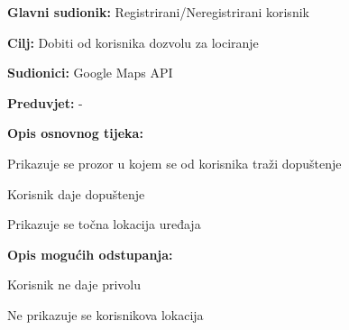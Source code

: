 					\noindent {}
					\begin{packed_item}
	
						\item \textbf{Glavni sudionik: }Registrirani/Neregistrirani korisnik
						\item  \textbf{Cilj:} Dobiti od korisnika dozvolu za lociranje
						\item  \textbf{Sudionici:} Google Maps API
						\item  \textbf{Preduvjet:} -
						\item  \textbf{Opis osnovnog tijeka:}
						
						\item[] \begin{packed_enum}
	
							\item Prikazuje se prozor u kojem se od korisnika traži dopuštenje
							\item Korisnik daje dopuštenje
							\item Prikazuje se točna lokacija uređaja

						\end{packed_enum}
						
						\item  \textbf{Opis mogućih odstupanja:}
						
						\item[] \begin{packed_item}
	
							\item[2.a] Korisnik ne daje privolu
							\item[] \begin{packed_enum}
								
								\item Ne prikazuje se korisnikova lokacija
								
							\end{packed_enum}
							
						\end{packed_item}
						
					\end{packed_item}
					
